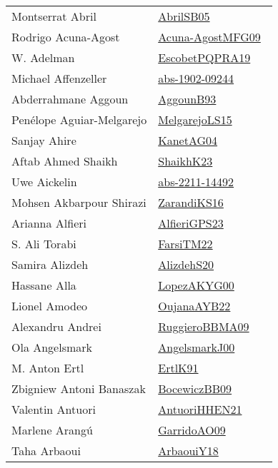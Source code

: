 {\begin{longtable}{p{4cm}p{20cm}}
Montserrat Abril & \href{works/AbrilSB05.pdf}{AbrilSB05}~\cite{AbrilSB05}\\
Rodrigo Acuna{-}Agost & \href{works/Acuna-AgostMFG09.pdf}{Acuna-AgostMFG09}~\cite{Acuna-AgostMFG09}\\
W. Adelman & \href{works/EscobetPQPRA19.pdf}{EscobetPQPRA19}~\cite{EscobetPQPRA19}\\
Michael Affenzeller & \href{works/abs-1902-09244.pdf}{abs-1902-09244}~\cite{abs-1902-09244}\\
Abderrahmane Aggoun & \href{works/AggounB93.pdf}{AggounB93}~\cite{AggounB93}\\
Pen{\'{e}}lope Aguiar{-}Melgarejo & \href{works/MelgarejoLS15.pdf}{MelgarejoLS15}~\cite{MelgarejoLS15}\\
Sanjay Ahire & \href{}{KanetAG04}~\cite{KanetAG04}\\
Aftab Ahmed Shaikh & \href{works/ShaikhK23.pdf}{ShaikhK23}~\cite{ShaikhK23}\\
Uwe Aickelin & \href{works/abs-2211-14492.pdf}{abs-2211-14492}~\cite{abs-2211-14492}\\
Mohsen Akbarpour Shirazi & \href{works/ZarandiKS16.pdf}{ZarandiKS16}~\cite{ZarandiKS16}\\
Arianna Alfieri & \href{works/AlfieriGPS23.pdf}{AlfieriGPS23}~\cite{AlfieriGPS23}\\
S. Ali Torabi & \href{}{FarsiTM22}~\cite{FarsiTM22}\\
Samira Alizdeh & \href{}{AlizdehS20}~\cite{AlizdehS20}\\
Hassane Alla & \href{works/LopezAKYG00.pdf}{LopezAKYG00}~\cite{LopezAKYG00}\\
Lionel Amodeo & \href{works/OujanaAYB22.pdf}{OujanaAYB22}~\cite{OujanaAYB22}\\
Alexandru Andrei & \href{works/RuggieroBBMA09.pdf}{RuggieroBBMA09}~\cite{RuggieroBBMA09}\\
Ola Angelsmark & \href{works/AngelsmarkJ00.pdf}{AngelsmarkJ00}~\cite{AngelsmarkJ00}\\
M. Anton Ertl & \href{works/ErtlK91.pdf}{ErtlK91}~\cite{ErtlK91}\\
Zbigniew Antoni Banaszak & \href{works/BocewiczBB09.pdf}{BocewiczBB09}~\cite{BocewiczBB09}\\
Valentin Antuori & \href{works/AntuoriHHEN21.pdf}{AntuoriHHEN21}~\cite{AntuoriHHEN21}\\
Marlene Arang{\'{u}} & \href{works/GarridoAO09.pdf}{GarridoAO09}~\cite{GarridoAO09}\\
Taha Arbaoui & \href{works/ArbaouiY18.pdf}{ArbaouiY18}~\cite{ArbaouiY18}\\

\end{longtable}}
